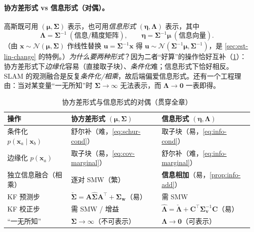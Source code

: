 \paragraph{协方差形式 vs 信息形式（对偶）。}
高斯既可用 $(\boldsymbol{\mu},\boldsymbol{\Sigma})$ 表示，也可用\emph{信息形式} $(\boldsymbol{\eta},\boldsymbol{\Lambda})$ 表示，其中
\begin{equation}
  \boldsymbol{\Lambda}=\boldsymbol{\Sigma}^{-1}\ (\text{信息/精度矩阵}),\qquad
  \boldsymbol{\eta}=\boldsymbol{\Sigma}^{-1}\boldsymbol{\mu}\ (\text{信息向量}).
  \label{eq:info-form}
\end{equation}
（由 $\mathbf{x}\sim\mathcal{N}(\boldsymbol{\mu},\boldsymbol{\Sigma})$ 作线性替换 $\mathbf{u}=\boldsymbol{\Sigma}^{-1}\mathbf{x}$ 得 $\mathbf{u}\sim\mathcal{N}(\boldsymbol{\Sigma}^{-1}\boldsymbol{\mu},\boldsymbol{\Sigma}^{-1})$，是 \cref{sec:est-lin-change} 的特例。）\emph{为什么要两种形式}？因为二者“好算”的操作恰好互补（\cref{tab:cov-info}）：协方差形式下\emph{边缘化}容易（直接取子块）、\emph{条件化}难；信息形式下恰好相反。SLAM 的观测融合是反复\emph{条件化/相乘}，故后端偏爱信息形式。还有一个工程理由：当对某变量“一无所知”时 $\boldsymbol{\Sigma}\to\infty$ 无法表示，而 $\boldsymbol{\Lambda}\to\mathbf{0}$ 一表即得。

\begin{table}[H]\centering\small
\caption{协方差形式与信息形式的对偶（贯穿全章）}
\label{tab:cov-info}
\begin{tabular}{lll}
\toprule
操作 & 协方差形式 $(\boldsymbol{\mu},\boldsymbol{\Sigma})$ & 信息形式 $(\boldsymbol{\eta},\boldsymbol{\Lambda})$ \\
\midrule
条件化 $p(\mathbf{x}_a\mid\mathbf{x}_b)$ & 舒尔补（难，\cref{eq:schur-cond}） & 取子块（易，\cref{eq:info-cond}） \\
边缘化 $p(\mathbf{x}_a)$ & 取子块（易，\cref{eq:cov-marginal}） & 舒尔补（难，\cref{eq:info-marginal}） \\
独立信息融合（相乘） & 逐对 SMW（繁） & \textbf{信息相加}（易，\cref{prop:info-add}） \\
KF 预测步 & $\check{\boldsymbol{\Sigma}}=\mathbf{A}\hat{\boldsymbol{\Sigma}}\mathbf{A}^\top+\boldsymbol{\Sigma}_{\mathbf{w}}$（易） & 需 SMW \\
KF 校正步 & 需 SMW / 增益 & $\hat{\boldsymbol{\Lambda}}=\check{\boldsymbol{\Lambda}}+\mathbf{C}^\top\boldsymbol{\Sigma}_{\mathbf{v}}^{-1}\mathbf{C}$（易） \\
“一无所知” & $\boldsymbol{\Sigma}\to\infty$（不可表示） & $\boldsymbol{\Lambda}\to\mathbf{0}$（可表示） \\
\bottomrule
\end{tabular}
\end{table}

